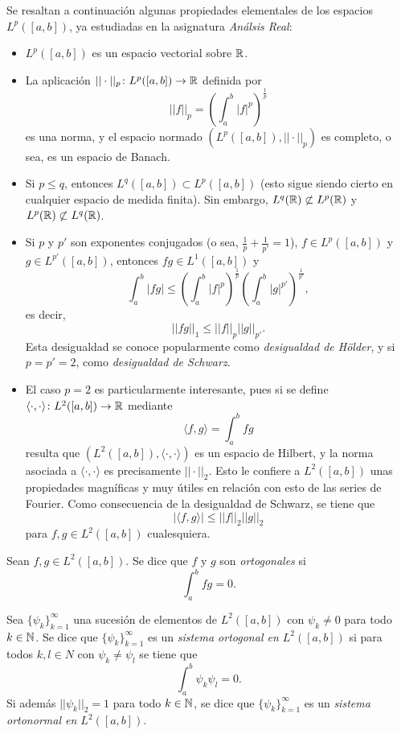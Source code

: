 \documentclass[a4paper, 12pt, extrafontsizes]{memoir}
\begin{document}
Se resaltan a continuación algunas propiedades elementales de los espacios $L^p([a,b])$, ya estudiadas en la asignatura \emph{Análsis Real}:
\begin{itemize}
    \item $L^p([a,b])$ es un espacio vectorial sobre $\mathbb R$. 
    \item La aplicación $||\cdot||_p \colon L^p([a,b]) \to \mathbb R$ definida por
    \[||f||_p = \left(\int_a^b |f|^p\right)^\frac{1}{p}\]
    es una norma, y el espacio normado $(L^p([a,b]),||\cdot||_p)$ es completo, o sea, es un espacio de Banach.
    \item Si $p \leq q$, entonces $L^q([a,b]) \subset L^p([a,b])$ (esto sigue siendo cierto en cualquier espacio de medida finita). Sin embargo, $L^q(\mathbb R) \not\subset L^p(\mathbb R)$ y $L^p(\mathbb R) \not\subset L^q(\mathbb R)$.
    \item Si $p$ y $p'$ son exponentes conjugados (o sea, $\frac{1}{p}+\frac{1}{p'} = 1$), $f \in L^p([a,b])$ y $g \in L^{p'}([a,b])$, entonces $fg \in L^1([a,b])$ y 
    \[\int_a^b |fg| \leq \left(\int_a^b |f|^p\right)^{\frac{1}{p}}\left(\int_a^b |g|^{p'}\right)^{\frac{1}{p'}},\]
    es decir,
    \[||fg||_1 \leq ||f||_p||g||_{p'}.\]
    Esta desigualdad se conoce popularmente como \emph{desigualdad de Hölder}, y si $p=p'=2$, como \emph{desigualdad de Schwarz}.
    \item El caso $p=2$ es particularmente interesante, pues si se define $\langle\cdot,\cdot\rangle \colon L^2([a,b]) \to \mathbb R$ mediante
    \[\langle f,g\rangle = \int_a^b fg\]
    resulta que $(L^2([a,b]),\langle\cdot,\cdot\rangle)$ es un espacio de Hilbert, y la norma asociada a $\langle\cdot,\cdot\rangle$ es precisamente $||\cdot||_2$. Esto le confiere a $L^2([a,b])$ unas propiedades magníficas y muy útiles en relación con esto de las series de Fourier. Como consecuencia de la desigualdad de Schwarz, se tiene que
    \[|\langle f,g\rangle| \leq ||f||_2||g||_2\]
    para $f,g \in L^2([a,b])$ cualesquiera.
\end{itemize}

\begin{definition}
    Sean $f,g \in L^2([a,b])$. Se dice que $f$ y $g$ son \emph{ortogonales} si
    \[\int_a^b fg = 0.\]
\end{definition}

\begin{definition}
    Sea $\{\psi_k\}_{k=1}^\infty$ una sucesión de elementos de $L^2([a,b])$ con $\psi_k \neq 0$ para todo $k \in \mathbb N$. Se dice que $\{\psi_k\}_{k=1}^\infty$ es un \emph{sistema ortogonal en $L^2([a,b])$} si para todos $k,l \in N$ con $\psi_k \neq \psi_l$ se tiene que
    \[\int_a^b \psi_k\psi_l = 0.\]
    Si además $||\psi_k||_2 = 1$ para todo $k \in \mathbb N$, se dice que $\{\psi_k\}_{k=1}^\infty$ es un \emph{sistema ortonormal en $L^2([a,b])$}.
\end{definition}
\end{document}
